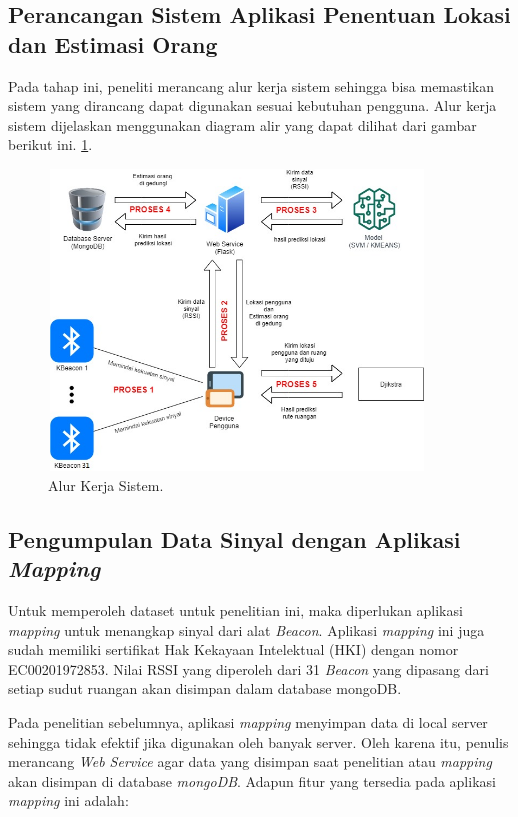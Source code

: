 \subsection{Perancangan Sistem Aplikasi Penentuan Lokasi dan Estimasi Orang}
Pada tahap ini, peneliti merancang alur kerja  sistem sehingga bisa memastikan sistem yang dirancang dapat digunakan sesuai kebutuhan pengguna. Alur kerja sistem dijelaskan menggunakan diagram alir yang dapat dilihat dari gambar berikut ini.
\ref{alur-kerja-sistem}.

\begin{figure}[H]
	\centering
	\includegraphics[width=10cm, height=8cm]{gambar/alurkerja.jpeg}
	\caption{Alur Kerja Sistem.}
	\label{alur-kerja-sistem}
\end{figure}

\subsection{Pengumpulan Data Sinyal dengan Aplikasi \textit{Mapping}}
\par Untuk memperoleh dataset untuk penelitian ini, maka diperlukan aplikasi \textit{mapping} untuk menangkap sinyal  dari alat \textit{Beacon}. Aplikasi \textit{mapping} ini juga sudah memiliki sertifikat Hak Kekayaan Intelektual (HKI) dengan nomor EC00201972853. Nilai RSSI yang diperoleh dari 31 \textit{Beacon} yang dipasang dari setiap sudut ruangan akan disimpan dalam database mongoDB.
\par Pada penelitian sebelumnya, aplikasi \textit{mapping} menyimpan data di local server sehingga  tidak efektif jika digunakan oleh banyak server. Oleh karena itu, penulis merancang \textit{Web Service} agar data yang disimpan saat penelitian atau \textit{mapping} akan disimpan di database \textit{mongoDB}. Adapun fitur yang tersedia pada aplikasi \textit{mapping} ini adalah:

